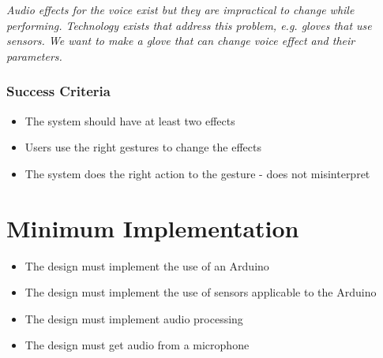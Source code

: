 \textit{Audio effects for the voice exist but they are impractical to change while performing. Technology exists that address this problem, e.g. gloves that use sensors. We want to make a glove that can change voice effect and their parameters.}

\subsubsection{Success Criteria}

\begin{itemize}
	\item The system should have at least two effects
	\item Users use the right gestures to change the effects
	\item The system does the right action to the gesture - does not misinterpret 
\end{itemize}



\section{Minimum Implementation}
\begin{itemize}
	\item The design must implement the use of an Arduino
	\item The design must implement the use of sensors applicable to the Arduino
	\item The design must implement audio processing
	\item The design must get audio from a microphone
\end{itemize}

